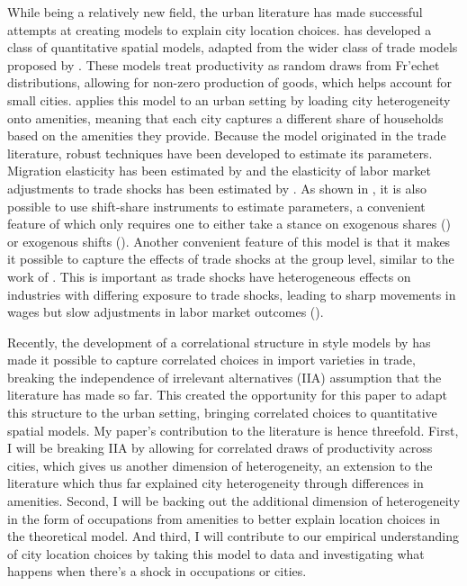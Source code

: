 \documentclass[10pt]{article}
\begin{document}
While being a relatively new field, the urban literature has made successful attempts at creating models to explain city location choices. \cite{redding2017} has developed a class of quantitative spatial models, adapted from the wider class of trade models proposed by \cite{ek}. These models treat productivity as random draws from Fr'{e}chet distributions, allowing for non-zero production of goods, which helps account for small cities. \cite{redding} applies this model to an urban setting by loading city heterogeneity onto amenities, meaning that each city captures a different share of households based on the amenities they provide. Because the model originated in the trade literature, robust techniques have been developed to estimate its parameters. Migration elasticity has been estimated by \cite{albert_monras2022} and the elasticity of labor market adjustments to trade shocks has been estimated by \cite{kim_vogel2020}. As shown in \cite{adh2013}, it is also possible to use \cite{bartik1991} shift-share instruments to estimate parameters, a convenient feature of which only requires one to either take a stance on exogenous shares (\cite{pssh2020}) or exogenous shifts (\cite{bhj2020}). Another convenient feature of this model is that it makes it possible to capture the effects of trade shocks at the group level, similar to the work of \cite{galle2023}. This is important as trade shocks have heterogeneous effects on industries with differing exposure to trade shocks, leading to sharp movements in wages but slow adjustments in labor market outcomes (\cite{acm2010}).

Recently, the development of a correlational structure in \cite{ek} style models by \cite{lindandramondo} has made it possible to capture correlated choices in import varieties in trade, breaking the independence of irrelevant alternatives (IIA) assumption that the literature has made so far. This created the opportunity for this paper to adapt this structure to the urban setting, bringing correlated choices to quantitative spatial models. My paper's contribution to the literature is hence threefold. First, I will be breaking IIA by allowing for correlated draws of productivity across cities, which gives us another dimension of heterogeneity, an extension to the literature which thus far explained city heterogeneity through differences in amenities. Second, I will be backing out the additional dimension of heterogeneity in the form of occupations from amenities to better explain location choices in the theoretical model. And third, I will contribute to our empirical understanding of city location choices by taking this model to data and investigating what happens when there's a shock in occupations or cities.
\end{document}
